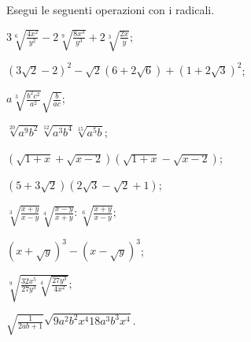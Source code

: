 \begin{esercizio}[\Ast]
 \label{ese:2.76}
Esegui le seguenti operazioni con i radicali.
 \begin{multicols}{2}
 \begin{enumeratea}
 \item $3\sqrt[6]{\frac{4x^{2}}{y^{2}}}-2\sqrt[9]{\frac{8x^{3}}{y^{3}}}+2\sqrt[3]{\frac{2x}{y}}$;
 \item $(3\sqrt{2}-2)^{2}-\sqrt{2}(6+2\sqrt{6})+(1+2\sqrt{3})^{2}$;
 \item $a\sqrt[3]{\frac{b^{2}c^{2}}{a^{2}}}\sqrt{\frac{b}{ac}}$;
 \item $\sqrt[20]{a^{9}b^{2}}\sqrt[12]{a^{3}b^{4}}\sqrt[15]{a^{5}b}$;
 \item $\left(\sqrt{1+x}+\sqrt{x-2}\right)\left(\sqrt{1+x}-\sqrt{x-2}\right)$;
 \item $\left(5+3\sqrt{2}\right)\left(2\sqrt{3}-\sqrt{2}+1\right)$;
 \item $\sqrt[3]{\frac{x+y}{x-y}}\sqrt[4]{\frac{x-y}{x+y}}:\sqrt[6]{\frac{x+y}{x-y}}$;
 \item $\left(x+\sqrt{y}\right)^{3}-\left(x-\sqrt{y}\right)^{3}$;
 \item $\sqrt[9]{\frac{32x^{5}}{27y^{3}}\sqrt[4]{\frac{27y^{3}}{4x^{2}}}}$;
 \item $\sqrt{\frac{1}{2ab+1}}\sqrt{9a^{2}b^{2}x^{4}18a^{3}b^{3}x^{4}}$.
 \end{enumeratea}
 \end{multicols}
\end{esercizio}

